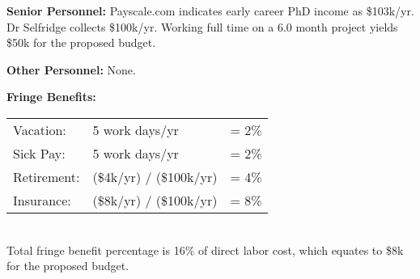 \documentclass[11pt]{article}
\begin{document}
{\bf Senior Personnel:} Payscale.com indicates early career PhD income as \$103k/yr.  Dr Selfridge collects \$100k/yr.  Working full time on a 6.0 month project yields \$50k for the proposed budget.


{\bf Other Personnel:} None.


{\bf Fringe Benefits:} \\
\begin{tabular}{lll}
Vacation:     &  5 work days/yr         & = 2\%  \\
Sick Pay:     &  5 work days/yr         & = 2\%  \\
Retirement:   & (\$4k/yr) / (\$100k/yr) & = 4\%  \\
Insurance:    & (\$8k/yr) / (\$100k/yr) & = 8\%  \\
\end{tabular}  \\
Total fringe benefit percentage is 16\% of direct labor cost, which equates to \$8k for the proposed budget.
\end{document}
